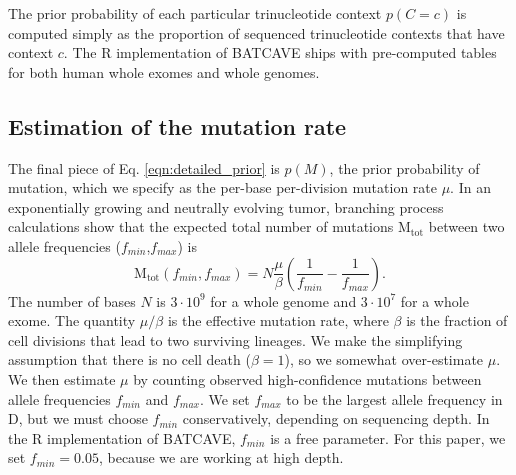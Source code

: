\documentclass[a4,center,fleqn]{NAR}
\newcommand{\batcave}{BATCAVE\xspace}
\begin{document}
The prior probability of each particular trinucleotide context $p(C = c)$ is computed simply as the proportion of sequenced trinucleotide contexts that have context $c$.
The R implementation of \batcave ships with pre-computed tables for both human whole exomes and whole genomes.

\subsection{Estimation of the mutation rate}
The final piece of Eq. \ref{eqn:detailed_prior} is $p(M)$, the prior probability of mutation, which we specify as the per-base per-division mutation rate $\mu$.
In an exponentially growing and neutrally evolving tumor, branching process calculations \cite{Williams2018} show that the expected total number of mutations $\mathrm{M_{tot}}$ between two allele frequencies ($f_{min}$,$f_{max}$) is
\begin{equation}
  \label{eqn:mut_rate}
  \mathrm{M_{tot}}(f_{min},f_{max}) = N\frac{\mu}{\beta}\left(\frac{1}{f_{min}} - \frac{1}{f_{max}}\right).
\end{equation}
The number of bases $N$ is $3\cdot10^9$ for a whole genome and $3\cdot10^7$ for a whole exome.
The quantity $\mu/\beta$ is the effective mutation rate, where $\beta$ is the fraction of cell divisions that lead to two surviving lineages.
We make the simplifying assumption that there is no cell death ($\beta = 1$), so we somewhat over-estimate $\mu$.
We then estimate $\mu$ by counting observed high-confidence mutations between allele frequencies $f_{min}$ and $f_{max}$.
We set $f_{max}$ to be the largest allele frequency in $\mathrm{D}$, but we must choose $f_{min}$ conservatively, depending on sequencing depth.
In the R implementation of \batcave, $f_{min}$ is a free parameter.
For this paper, we set $f_{min} = 0.05$, because we are working at high depth.
\end{document}
